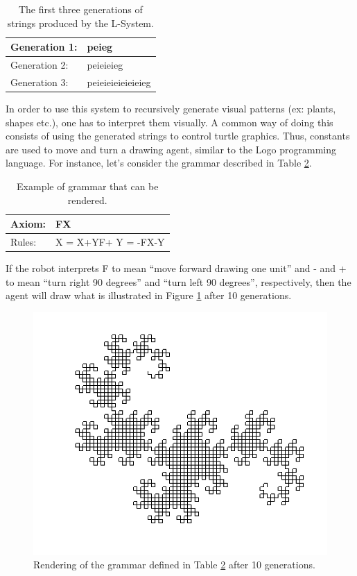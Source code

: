 \documentclass{article}
\begin{document}
\begin{table}[]
\centering
\begin{tabular}{|l|l|}
\hline
Generation 1: & peieg             \\ \hline
Generation 2: & peieieieg         \\ \hline
Generation 3: & peieieieieieieieg \\ \hline
\end{tabular}
\caption{The first three generations of strings produced by the L-System.}
\label{tab:example2}
\end{table}

In order to use this system to recursively generate visual patterns (ex: plants, shapes etc.), one
has to interpret them visually. A common way of doing this consists of using
the generated strings to control turtle graphics. Thus, constants are
used to move and turn a drawing agent, similar to the Logo programming language.
For instance, let's consider the grammar described in Table \ref{tab:example3}.

\begin{table}[!h]
\centering
\begin{tabular}{|l|p{25mm}|}
\hline
Axiom: & FX        \\ \hline
Rules: & X = X+YF+ \newline Y = -FX-Y \\ \hline
\end{tabular}
\caption{Example of grammar that can be rendered.}
\label{tab:example3}
\end{table}

If the robot interprets F to mean ``move forward drawing one unit'' and - and + to
mean ``turn right 90 degrees'' and ``turn left 90 degrees'', respectively, then the agent will
draw what is illustrated in Figure \ref{fig:rendered} after 10 generations.
\begin{figure}[!h]
\centering
\includegraphics[width=0.48 \textwidth]{Images/result4.png}
\vskip -6pt
\caption{Rendering of the grammar defined in Table \ref{tab:example3} after 10 generations.}
\label{fig:rendered}
\end{figure}
\end{document}
